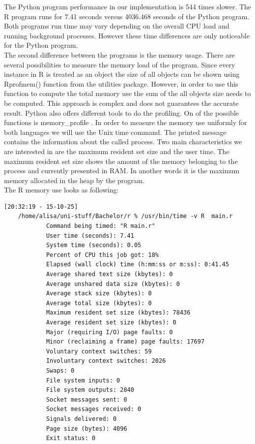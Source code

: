 \documentclass[
  twoside,
  11pt, a4paper,
  footinclude=true,
  headinclude=true,
  cleardoublepage=empty
]{scrreprt}
\begin{document}
    The Python program performance in our implementation is 544 times slower. The R program runs for 7.41 seconds versus 4036.468 seconds of the Python program. Both programs run time may vary depending on the overall CPU load and running background processes. However these time differences are only noticeable for the Python program.\\
    The second difference between the programs is the memory usage. There are several possibilities to measure the memory load of the program. Since every instance in R is treated as an object the size of all objects can be shown using Rprofmem() function from the utilities package. However, in order to use this function to compute the total memory use the sum of the all objects size needs to be computed. This approach is complex and does not guarantees the accurate result. Python also offers different tools to do the profiling. On of the possible functions is memory\_profile \cite{python:MemoryProfiler}. In order to measure the memory use uniformly for both languages we will use the Unix time command. The printed message contains the information about the called process. Two main characteristics we are interested in are the maximum resident set size and the user time. The maximum resident set size shows the amount of the memory belonging to the process and currently presented in RAM. In another words it is the maximum memory allocated in the heap by the program.\\ 
    The R memory use looks as following:
    \begin{lstlisting}[basicstyle=\footnotesize]
    [20:32:19 - 15-10-25] 
    /home/alisa/uni-stuff/Bachelor/r % /usr/bin/time -v R  main.r
            Command being timed: "R main.r"
            User time (seconds): 7.41
            System time (seconds): 0.05
            Percent of CPU this job got: 18%
            Elapsed (wall clock) time (h:mm:ss or m:ss): 0:41.45
            Average shared text size (kbytes): 0
            Average unshared data size (kbytes): 0
            Average stack size (kbytes): 0
            Average total size (kbytes): 0
            Maximum resident set size (kbytes): 78436
            Average resident set size (kbytes): 0
            Major (requiring I/O) page faults: 0
            Minor (reclaiming a frame) page faults: 17697
            Voluntary context switches: 59
            Involuntary context switches: 2026
            Swaps: 0
            File system inputs: 0
            File system outputs: 2840
            Socket messages sent: 0
            Socket messages received: 0
            Signals delivered: 0
            Page size (bytes): 4096
            Exit status: 0
    \end{lstlisting}
\end{document}
